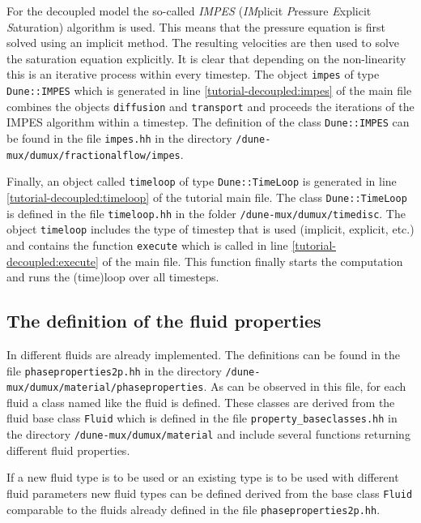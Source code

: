 For the decoupled model the so-called \textit{IMPES} (\textit{IM}plicit \textit{P}ressure \textit{E}xplicit \textit{S}aturation) algorithm is used. This means that the pressure equation is first solved using an implicit method. The resulting velocities are then used to solve the saturation equation explicitly. It is clear that depending on the non-linearity this is an iterative process within every timestep. The object \texttt{impes} of type \texttt{Dune::IMPES} which is generated in line \ref{tutorial-decoupled:impes} of the main file combines the objects \texttt{diffusion} and \texttt{transport} and proceeds the iterations of the IMPES algorithm within a timestep. The definition of the class \texttt{Dune::IMPES} can be found in the file \texttt{impes.hh} in the directory \texttt{/dune-mux/dumux/fractionalflow/impes}.

Finally, an object called \texttt{timeloop} of type \texttt{Dune::TimeLoop} is generated in line \ref{tutorial-decoupled:timeloop} of the tutorial main file. The class \texttt{Dune::TimeLoop} is defined in the file \texttt{timeloop.hh} in the folder \texttt{/dune-mux/dumux/timedisc}. The object \texttt{timeloop} includes the type of timestep that is used (implicit, explicit, etc.) and contains the function \texttt{execute} which is called in line \ref{tutorial-decoupled:execute} of the main file. This function finally starts the computation and runs the (time)loop over all timesteps.

\subsection{The definition of the fluid properties}\label{tutorial-decoupled:description-fluid-class}

In \Dumux different fluids are already implemented. The definitions can be found in the file \texttt{phaseproperties2p.hh} in the directory \texttt{/dune-mux/dumux/material/phaseproperties}. As can be observed in this file, for each fluid a class named like the fluid is defined. These classes are derived from the fluid base class \texttt{Fluid} which is defined in the file \texttt{property\_baseclasses.hh} in the directory \texttt{/dune-mux/dumux/material} and include several functions returning different fluid properties.

If a new fluid type is to be used or an existing type is to be used with different fluid parameters new fluid types can be defined derived from the base class \texttt{Fluid} comparable to the fluids already defined in the file \texttt{phaseproperties2p.hh}.

